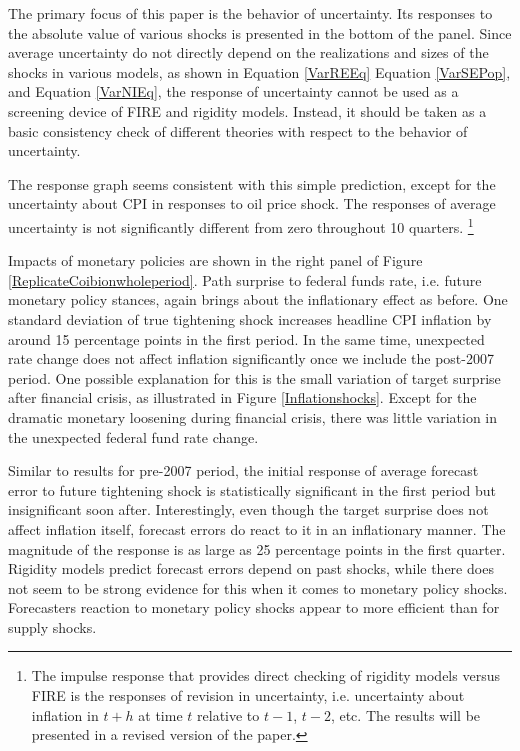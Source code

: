 \documentclass[]{article}
\begin{document}
	
	The primary focus of this paper is the behavior of uncertainty. Its responses to the absolute value of various shocks is presented in the bottom of the panel. Since  average uncertainty do not directly depend on the realizations and sizes of the shocks in various models, as shown in Equation \ref{VarREEq}  Equation \ref{VarSEPop}, and Equation \ref{VarNIEq}, the response of uncertainty cannot be used as a screening device of  FIRE and rigidity models. Instead, it should be taken as a basic consistency check of different theories with respect to the behavior of uncertainty.  
	
	The response graph seems consistent with this simple prediction, except for the uncertainty about CPI in responses to oil price shock. The responses of average uncertainty is not significantly different from zero throughout 10 quarters. \footnote{The impulse response that provides direct checking of rigidity models versus FIRE is the responses of revision in uncertainty, i.e. uncertainty about inflation in $t+h$ at time $t$ relative to $t-1$, $t-2$, etc. The results will be presented in a revised version of the paper.} 
	
	Impacts of monetary policies are shown in the right panel of Figure \ref{ReplicateCoibionwholeperiod}. Path surprise to federal funds rate, i.e. future monetary policy stances, again brings about the inflationary effect as before. One standard deviation of true tightening shock increases headline CPI inflation by around 15 percentage points in the first period.  In the same time, unexpected rate change does not affect inflation significantly once we include the post-2007 period.  One possible explanation for this is the small variation of target surprise after financial crisis, as illustrated in Figure \ref{Inflationshocks}. Except for the dramatic monetary loosening during financial crisis, there was little variation in the unexpected federal fund rate change.  
	
	Similar to results for pre-2007 period, the initial response of average forecast error to future tightening shock is statistically significant in the first period but insignificant soon after.  Interestingly, even though the target surprise does not affect inflation itself, forecast errors do react to it in an inflationary manner. The magnitude of the response is as large as 25 percentage points in the first quarter. Rigidity models predict forecast errors depend on past shocks, while there does not seem to be strong evidence for this when it comes to monetary policy shocks. Forecasters reaction to monetary policy shocks appear to more efficient than for supply shocks. 
	
\end{document}
